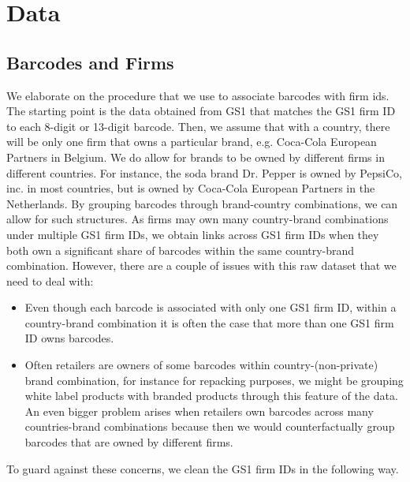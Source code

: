 \section{Data}
\subsection{Barcodes and Firms}\label{app:data_bars_firms}
We elaborate on the procedure that we use to associate barcodes with firm ids. The starting point is the data obtained from GS1 that matches the GS1 firm ID to each 8-digit or 13-digit barcode. Then, we assume that with a country, there will be only one firm that owns a particular brand, e.g. Coca-Cola European Partners in Belgium. We do allow for brands to be owned by different firms in different countries. For instance, the soda brand Dr. Pepper is owned by PepsiCo, inc. in most countries, but is owned by Coca-Cola European Partners in the Netherlands. By grouping barcodes through brand-country combinations, we can allow for such structures. As firms may own many country-brand combinations under multiple GS1 firm IDs, we obtain links across GS1 firm IDs when they both own a significant share of barcodes within the same country-brand combination. However, there are a couple of issues with this raw dataset that we need to deal with: 
\begin{itemize}
    \item   Even though each barcode is associated with only one GS1 firm ID, within a country-brand combination it is often the case that more than one GS1 firm ID owns barcodes.
    \item   Often retailers are owners of some barcodes within country-(non-private) brand combination, for instance for repacking purposes, we might be grouping white label products with branded products through this feature of the data. An even bigger problem arises when retailers own barcodes across many countries-brand combinations because then we would counterfactually group barcodes that are owned by different firms. 
\end{itemize}

\noindent To guard against these concerns, we clean the GS1 firm IDs in the following way. 

